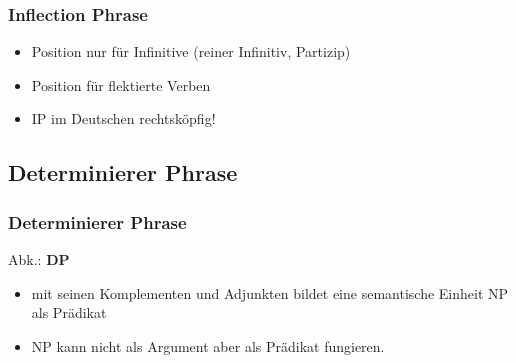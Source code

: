 \begin{frame}
\frametitle{Inflection Phrase}

	\begin{itemize}
		\item {} \ras Position nur für Infinitive (reiner Infinitiv, Partizip)
		\item {} \ras Position für flektierte Verben
		\item IP im Deutschen \ras rechtsköpfig!		
	\end{itemize}


\begin{figure}[b]
  	\begin{minipage}[b]{0.45\textwidth}
	\centering
  	\end{minipage}  
	\begin{minipage}[b]{0.45\textwidth}
	\centering
  	\end{minipage}  
\end{figure}

\end{frame}


\subsection{Determinierer Phrase}

\begin{frame}
\frametitle{Determinierer Phrase}

Abk.: \textbf{DP} 
	\begin{itemize}
		\item {} mit seinen Komplementen und Adjunkten bildet eine semantische Einheit \ras NP als Prädikat
		\item NP kann nicht als Argument aber als Prädikat fungieren.
		\eal 
		\zl
	
	\end{itemize}	

\end{frame}


